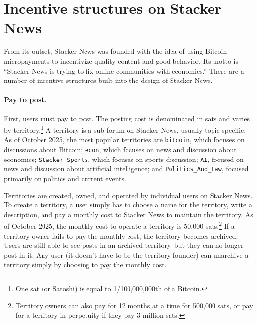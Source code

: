 \section{Incentive structures on Stacker News} \label{sec_incentives}

From its outset, Stacker News was founded with the idea of using Bitcoin micropayments to incentivize quality content and good behavior. Its motto is ``Stacker News is trying to fix online communities with economics.'' There are a number of incentive structures built into the design of Stacker News. 

\paragraph{Pay to post.} First, users must pay to post. The posting cost is denominated in sats and varies by territory.\footnote{One sat (or Satoshi) is equal to 1/100,000,000th of a Bitcoin.} A territory is a sub-forum on Stacker News, usually topic-specific. As of October 2025, the most popular territories are \texttt{bitcoin}, which focuses on discussions about Bitcoin; \texttt{econ}, which focuses on news and discussion about economics; \texttt{Stacker\_Sports}, which focuses on sports discussion; \texttt{AI}, focused on news and discussion about artificial intelligence; and \texttt{Politics\_And\_Law}, focused primarily on politics and current events. 

Territories are created, owned, and operated by individual users on Stacker News. To create a territory, a user simply has to choose a name for the territory, write a description, and pay a monthly cost to Stacker News to maintain the territory. As of October 2025, the monthly cost to operate a territory is 50,000 sats.\footnote{Territory owners can also pay for 12 months at a time for 500,000 sats, or pay for a territory in perpetuity if they pay 3 million sats.} If a territory owner fails to pay the monthly cost, the territory becomes archived. Users are still able to see posts in an archived territory, but they can no longer post in it. Any user (it doesn't have to be the territory founder) can unarchive a territory simply by choosing to pay the monthly cost.

